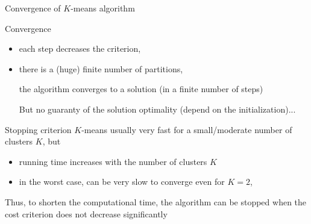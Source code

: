 \documentclass[compress, smaller, serif, 9pt]{beamer}
\newcommand{\structuretext}[1]{{\usebeamercolor[fg]{structure} #1}}
\newcommand{\doigt}{\structuretext{\noindent \Pisymbol{pzd}{43}}}
\begin{document}
\begin{frame}{Convergence of $K$-means algorithm}

\begin{block}{Convergence}
\begin{itemize}
 \item each step decreases the criterion, 
 \item there is a (huge) finite number of partitions,
 \item[\doigt] the algorithm \structuretext{converges} to a solution (in a finite number of steps)
 \item[\alert{But}] {no guaranty of the solution optimality} (depend on the initialization)...
\end{itemize}
\end{block}

\begin{block}{Stopping criterion}
$K$-means usually very fast for a small/moderate number of clusters $K$, but
\begin{itemize}
 \item running time increases with the number of clusters $K$
 \item in the worst case, can be very slow to converge even for $K=2$,
\end{itemize}
Thus, to shorten the computational time, the algorithm can be stopped when the 
cost criterion does not decrease significantly
\end{block}

\end{frame}
\end{document}
